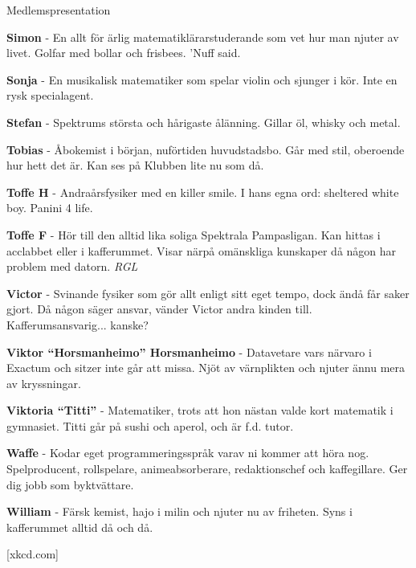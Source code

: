 \documentclass{spektraklet}
\begin{document}
\begin{artikel}{Medlemspresentation}{}
\begin{twocolumns}
\textbf{Simon} - En allt för ärlig matematiklärarstuderande som vet hur man njuter av livet. Golfar med bollar och frisbees. ’Nuff said.

\textbf{Sonja} - En musikalisk matematiker som spelar violin och sjunger i kör. Inte en rysk specialagent. %

\textbf{Stefan} - Spektrums största och hårigaste ålänning. Gillar öl, whisky och metal. %

\textbf{Tobias} - Åbokemist i början, nuförtiden huvudstadsbo. Går med stil, oberoende hur hett det är. Kan ses på Klubben lite nu som då. %

\textbf{Toffe H} - Andraårsfysiker med en killer smile. I hans egna ord: sheltered white boy. Panini 4 life.

\textbf{Toffe F} - Hör till den alltid lika soliga Spektrala Pampasligan. Kan hittas i acclabbet eller i kafferummet. Visar närpå omänskliga kunskaper då någon har problem med datorn. \emph{RGL}

\textbf{Victor} - Svinande fysiker som gör allt enligt sitt eget tempo, dock ändå får saker gjort. Då någon säger ansvar, vänder Victor andra kinden till. Kafferumsansvarig... kanske?

\textbf{Viktor ``Horsmanheimo'' Horsmanheimo} - Datavetare vars närvaro i Exactum och sitzer inte går att missa. Njöt av värnplikten och njuter ännu mera av kryssningar.

\textbf{Viktoria ``Titti''} - Matematiker, trots att hon nästan valde kort matematik i gymnasiet. Titti går på sushi och aperol, och är f.d. tutor.

\textbf{Waffe} - Kodar eget programmeringsspråk varav ni kommer att höra nog. Spelproducent, rollspelare, animeabsorberare, redaktionschef och kaffegillare. Ger dig jobb som byktvättare.

\textbf{William} - Färsk kemist, hajo i milin och njuter nu av friheten. Syns i kafferummet alltid då och då.

\end{twocolumns}

[xkcd.com]
\end{artikel}
\end{document}
